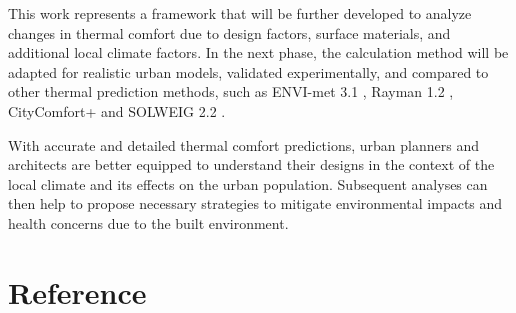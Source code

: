 \documentclass[preprint,3p,12pt,english]{elsarticle}
\begin{document}
This work represents a framework that will be further developed to analyze changes in thermal comfort due to design factors, surface materials, and additional local climate factors. In the next phase, the calculation method will be adapted for realistic urban models, validated experimentally, and compared to other thermal prediction methods, such as ENVI-met 3.1 \cite{bruse2004envi}, Rayman 1.2 \cite{matzarakis2007modelling}, CityComfort+ \cite{huang2014citycomfort+} and SOLWEIG 2.2 \cite{lindberg2008solweig}. 
	

With accurate and detailed thermal comfort predictions, urban planners and architects are better equipped to understand their designs in the context of the local climate and its effects on the urban population. Subsequent analyses can then help to propose necessary strategies to mitigate environmental impacts and health concerns due to the built environment. 




\section{Reference}



\end{document}
